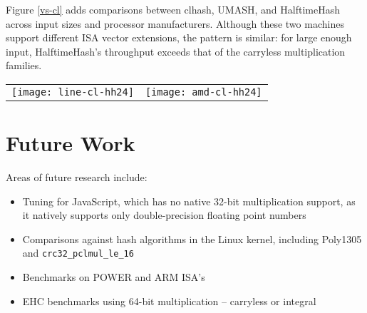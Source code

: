 \documentclass[runningheads]{llncs}
\begin{document}
Figure \ref{vs-cl} adds comparisons between clhash, UMASH, and HalftimeHash across input sizes and processor manufacturers.
Although these two machines support different ISA vector extensions, the pattern is similar: for large enough input, HalftimeHash's throughput exceeds that of the carryless multiplication families.
\begin{figure*}
\begin{tabular}{cc}
\texttt{[image: line-cl-hh24]}
&
\texttt{[image: amd-cl-hh24]}
\end{tabular}
\caption{
  \label{vs-cl}
  Comparison of Intel (i7-7800x) and AMD (EC2 c5a.large, 7R32) performance.
  On both chips HalftimeHash24 is faster than clhash and UMASH for long strings.
  The ``v3'' after the name of the AMD HalftimeHash indicates block size: v3 means a 256-bit block size, while v4 (the default) means 512-bit block size.
  AMD chips do not support AVX-512, but still HalftimeHash with 256-bit blocks exceeds the speed of clmul-based hashing methods by up to a factor of 2.
}
\end{figure*}

\section{Future Work}

Areas of future research include:

\begin{itemize}
\item Tuning for JavaScript, which has no native 32-bit multiplication support, as it natively supports only double-precision floating point numbers
\item Comparisons against hash algorithms in the Linux kernel, including Poly1305 and \texttt{crc32\_pclmul\_le\_16}
\item Benchmarks on POWER and ARM ISA's
\item EHC benchmarks using 64-bit multiplication -- carryless or integral
\end{itemize}


\end{document}
